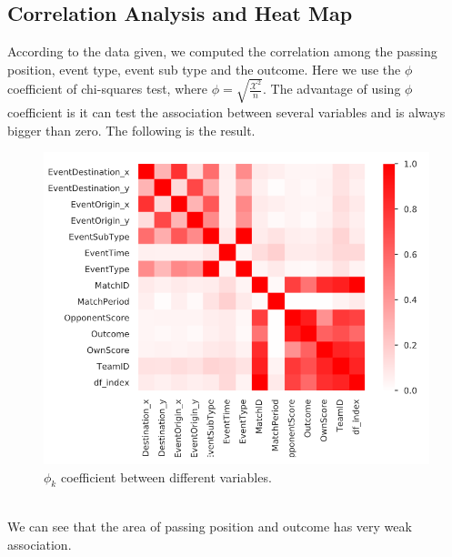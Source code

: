 \documentclass{mcmthesis}
\begin{document}
	\subsection{Correlation Analysis and Heat Map}
		According to the data given, we computed the correlation among the passing position, event type, event sub type and the outcome. Here we use the $\phi$ coefficient of chi-squares test, where $\phi=\sqrt{\frac{\mathcal{X}^2}{n}}$. The advantage of using $\phi$ coefficient is it can test the association between several variables and is always bigger than zero. The following is the result. 
		\begin{figure}[h!]
			\centering
			\includegraphics[scale=0.6]{images/cor_1.PNG}
			\caption{$\phi_k$ coefficient between different variables. }
		\end{figure} \\
		
		We can see that the area of passing position and outcome has very weak association. 
		
		
\end{document}
